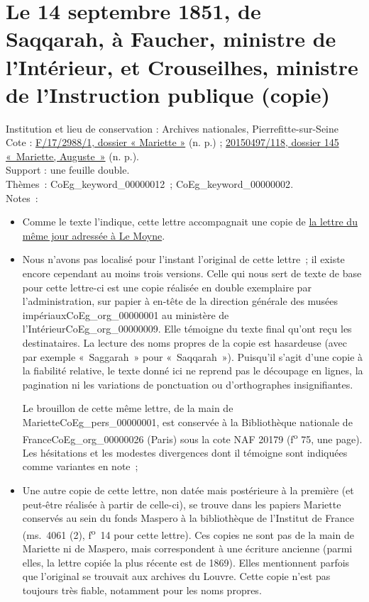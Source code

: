 \documentclass{book}
\begin{document}
\hypertarget{CoEg_Mariette_1851-09-14b}{}
\section*{Le 14 septembre 1851, de Saqqarah, à Faucher, ministre de l’Intérieur, et Crouseilhes, ministre de l’Instruction publique (copie)} 
{\footnotesize
\noindent Institution et lieu de conservation : Archives nationales, Pierrefitte-sur-Seine\\
Cote : \hyperlink{CoEg_Mariette_ms_002}{F/17/2988/1, dossier « Mariette »} (n. p.) ; \hyperlink{CoEg_Mariette_ms_001}{20150497/118, dossier 145 «~Mariette, Auguste~»} (n. p.).\\
Support : une feuille double.\\
Thèmes~: \gls{CoEg_keyword_00000012}~; \gls{CoEg_keyword_00000002}.\\
Notes~: \begin{itemize} \item Comme le texte l’indique, cette lettre accompagnait une copie de \hyperlink{CoEg_Mariette_1851-09-14a}{la lettre du même jour adressée à Le Moyne}.
\item Nous n’avons pas localisé pour l’instant l’original de cette lettre~; il existe encore cependant au moins trois versions. Celle qui nous sert de texte de base pour cette lettre-ci est une copie réalisée en double exemplaire par l’administration, sur papier à en-tête de la direction générale des musées impériaux\gls{CoEg_org_00000001} au ministère de l’Intérieur\gls{CoEg_org_00000009}. Elle témoigne du texte final qu’ont reçu les destinataires. La lecture des noms propres de la copie est hasardeuse (avec par exemple «~Saggarah~» pour «~Saqqarah~»). Puisqu’il s’agit d’une copie à la fiabilité relative, le texte donné ici ne reprend pas le découpage en lignes, la pagination ni les variations de ponctuation ou d’orthographes insignifiantes.
\par Le brouillon de cette même lettre, de la main de Mariette\gls{CoEg_pers_00000001}, est conservée à la Bibliothèque nationale de France\gls{CoEg_org_00000026} (Paris) sous la cote NAF 20179 (f\textsuperscript{o} 75, une page). Les hésitations et les modestes divergences dont il témoigne sont indiquées comme variantes en note~;
\item Une autre copie de cette lettre, non datée mais postérieure à la première (et peut-être réalisée à partir de celle-ci), se trouve dans les papiers Mariette conservés au sein du fonds Maspero à la bibliothèque de l’Institut de France (ms.~4061 (2), f\textsuperscript{o}~14 pour cette lettre). Ces copies ne sont pas de la main de Mariette ni de Maspero, mais correspondent à une écriture ancienne (parmi elles, la lettre copiée la plus récente est de 1869). Elles mentionnent parfois que l’original se trouvait aux archives du Louvre. Cette copie n’est pas toujours très fiable, notamment pour les noms propres. \end{itemize}}
\end{document}
